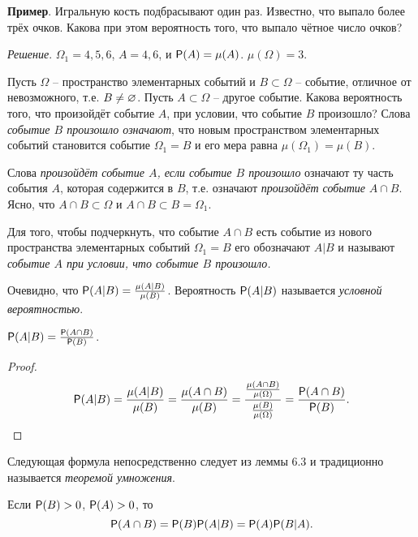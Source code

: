 \textbf{Пример}. Игральную кость подбрасывают один раз. Известно, что выпало более трёх очков. Какова при этом вероятность того, что выпало чётное число очков?

\textit{Решение}. $\Omega_1 = {4, 5, 6}$, $A = {4, 6}$, и $\P(A) = \mu(A)$. $\mu(\Omega) = 3$.

\begin{zam}
\label{zam:6.1}
Пусть $\Omega$ -- пространство элементарных событий и $B \subset \Omega$ -- событие, отличное от невозможного, т.е. $B \ne \noo$. 
Пусть $A \subset \Omega$ – другое событие. Какова вероятность того, что произойдёт событие $A$, при условии,
что событие $B$ произошло? Слова \textit{событие $B$ произошло означают}, что новым пространством элементарных событий становится событие $\Omega_1 = B$ и его мера равна $\mu(\Omega_1 ) = \mu(B)$. 

Слова \textit{произойдёт событие $A$, если событие $B$
произошло} означают ту часть события $A$, которая содержится в $B$, т.е. означают \textit{произойдёт событие} $A \cap B$. Ясно, что $A \cap B \subset \Omega$ и $A \cap B \subset B = \Omega_1$.
\end{zam}

\begin{definition}
\label{def:6.2}
Для того, чтобы подчеркнуть, что событие $A \cap B$ есть
событие из нового пространства элементарных событий $\Omega_1 = B$ его обозначают $A|B$ и называют \textit{событие $A$ при условии, что событие $B$ произошло.}

Очевидно, что $\P(A|B)=\frac{\mu(A|B)}{\mu(B)}$. Вероятность $\P(A|B)$ называется \textit{условной вероятностью}.
\end{definition}

\begin{lemma}
\label{lemma:6.3}
	$\P(A|B) = \frac{\P(A\cap B)}{\P(B)}$.
\end{lemma}

\begin{proof}
\begin{equation*}
	\P(A|B) = \frac{\mu(A|B)}{\mu(B)}=\frac{\mu(A\cap B)}{\mu(B)}
=\frac{\frac{\mu(A\cap B)}{\mu(\Omega)}}{\frac{\mu(B)}{\mu(\Omega)}}
=\frac{\P(A\cap B)}{\P(B)}.
\end{equation*}	
\end{proof}

Следующая формула непосредственно следует из леммы 6.3 и традиционно называется \textit{теоремой умножения}.

\begin{theorem}
\label{th:6.4}
Если $\P(B) > 0$, $\P(A) > 0$, то
\begin{equation*}
	\P(A \cap B) = \P(B)\P(A|B) = \P(A)\P(B|A).
\end{equation*}
\end{theorem}


